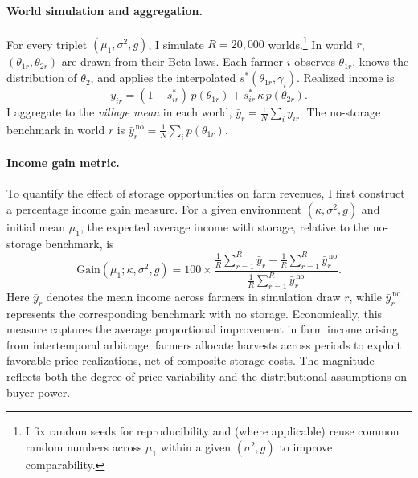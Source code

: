 \paragraph{World simulation and aggregation.}
For every triplet $(\mu_1,\sigma^2,g)$, I simulate $R=20{,}000$ worlds.\footnote{I fix random seeds for reproducibility and (where applicable) reuse common random numbers across $\mu_1$ within a given $(\sigma^2,g)$ to improve comparability.} In world $r$, $(\theta_{1r},\theta_{2r})$ are drawn from their Beta laws. Each farmer $i$ observes $\theta_{1r}$, knows the distribution of $\theta_2$, and applies the interpolated $s^*(\theta_{1r},\gamma_i)$. Realized income is
$$
y_{ir}=(1-s^*_{ir})\,p(\theta_{1r})+s^*_{ir}\,\kappa\,p(\theta_{2r}).
$$
I aggregate to the \emph{village mean} in each world, $\bar y_r=\frac{1}{N}\sum_i y_{ir}$. The no-storage benchmark in world $r$ is $\bar y^{\,\text{no}}_r=\frac{1}{N}\sum_i p(\theta_{1r})$.



\paragraph{Income gain metric.}  
To quantify the effect of storage opportunities on farm revenues, I first construct a percentage income gain measure. For a given environment $(\kappa,\sigma^2,g)$ and initial mean $\mu_1$, the expected average income with storage, relative to the no-storage benchmark, is  
\begin{equation}
\mathrm{Gain}(\mu_1;\kappa,\sigma^2,g)
=100\times
\frac{\frac{1}{R}\sum_{r=1}^R \bar y_{r}-\frac{1}{R}\sum_{r=1}^R \bar y^{\,\text{no}}_{r}}
{\frac{1}{R}\sum_{r=1}^R \bar y^{\,\text{no}}_{r}}.
\end{equation}
Here $\bar y_r$ denotes the mean income across farmers in simulation draw $r$, while $\bar y^{\,\text{no}}_{r}$ represents the corresponding benchmark with no storage. Economically, this measure captures the average proportional improvement in farm income arising from intertemporal arbitrage: farmers allocate harvests across periods to exploit favorable price realizations, net of composite storage costs. The magnitude reflects both the degree of price variability and the distributional assumptions on buyer power.


